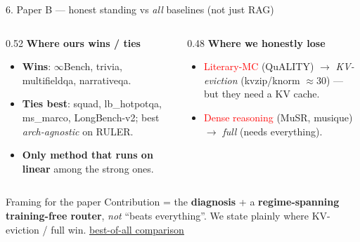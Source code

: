 \documentclass[aspectratio=169]{beamer}
\newcommand{\ghbase}{https://github.com/BDeMo/research-notes/blob/main/notes/plans/08-compressed-context-memory}
\newcommand{\ghB}[2]{\href{\ghbase/papers/paper-b-forgetting-gating/#1}{\color{blue}\underline{#2}}}
\newcommand{\best}[1]{\textbf{#1}}
\begin{document}
\begin{frame}{6. Paper B --- honest standing vs \emph{all} baselines (not just RAG)}
  \begin{columns}[T]
  \begin{column}{0.52\textwidth}
  \textbf{Where ours wins / ties}
  \begin{itemize}\small
    \item \best{Wins}: $\infty$Bench, trivia, multifieldqa, narrativeqa.
    \item \best{Ties best}: squad, lb\_hotpotqa, ms\_marco, LongBench-v2; best \emph{arch-agnostic} on RULER.
    \item \best{Only method that runs on linear} among the strong ones.
  \end{itemize}
  \end{column}
  \begin{column}{0.48\textwidth}
  \textbf{Where we honestly lose}
  \begin{itemize}\small
    \item \textcolor{red}{Literary-MC} (QuALITY) $\to$ \emph{KV-eviction} (kvzip/knorm $\approx$30) --- but they need a KV cache.
    \item \textcolor{red}{Dense reasoning} (MuSR, musique) $\to$ \emph{full} (needs everything).
  \end{itemize}
  \end{column}
  \end{columns}
  \vspace{0.4em}
  \begin{block}{Framing for the paper}
  \footnotesize Contribution = the \best{diagnosis} + a \best{regime-spanning training-free router}, \emph{not} ``beats everything''.
  We state plainly where KV-eviction / full win. \ghB{best-of-all-baselines-2026-07-13.md}{best-of-all comparison}
  \end{block}
\end{frame}
\end{document}
